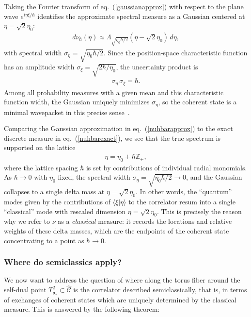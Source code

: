 \documentclass[a4paper,11pt]{article}
\theoremstyle{plain}
\theoremstyle{definition}
\theoremstyle{remark}
\newcommand{\bs}[1]{\boldsymbol{#1}}
\newcommand{\ba}{\begin{equation} \begin{aligned}}
\newcommand{\ea}{\end{aligned} \end{equation}}
\begin{document}
Taking the Fourier transform of eq.~(\ref{gaussianapprox}) with respect to the plane wave $e^{i\eta\xi/\hbar}$ identifies the approximate spectral measure as a Gaussian centered at $\eta = \sqrt{2}\eta_0$:
\ba
d\nu_\hbar(\eta) \approx \Lambda_{\sqrt{\eta_0 \hbar/2}}(\eta - \sqrt{2}\eta_0) \, d\eta,
\label{nuhbarapprox}
\ea
with spectral width $\sigma_\eta = \sqrt{\eta_0 \hbar/2}$. Since the position-space characteristic function has an amplitude width $\sigma_\xi = \sqrt{2\hbar/\eta_0}$, the uncertainty product is
\ba
\sigma_\eta \, \sigma_\xi = \hbar.
\ea
Among all probability measures with a given mean and this characteristic function width, the Gaussian uniquely minimizes $\sigma_\eta$, so the coherent state is a minimal wavepacket in this precise sense~\cite{FollandSitaram1997}.

Comparing the Gaussian approximation in eq.~(\ref{nuhbarapprox}) to the exact discrete measure in eq.~(\ref{nuhbarexact}), we see that the true spectrum is supported on the lattice
\ba
\eta = \eta_0 + \hbar \mathbb{Z}_+,
\ea
where the lattice spacing $\hbar$ is set by contributions of individual radial monomials. As $\hbar \to 0$ with $\eta_0$ fixed, the spectral width $\sigma_\eta = \sqrt{\eta_0\hbar/2} \to 0$, and the Gaussian collapses to a single delta mass at $\eta = \sqrt{2}\eta_0$. In other words, the ``quantum'' modes given by the contributions of $\langle \xi | \eta \rangle$ to the correlator resum into a single ``classical'' mode with rescaled dimension $\eta = \sqrt{2}\eta_0$. This is precisely the reason why we refer to $\nu$ as a \textit{classical} measure: it records the locations and relative weights of these delta masses, which are the endpoints of the coherent state concentrating to a point as $\hbar \to 0$.

\subsubsection{Where do semiclassics apply?}
We now want to address the question of where along the torus fiber around the self-dual point $T^2_{\bs{\rho}_*} \subset \widehat{\mathscr{C}}$ is the correlator described semiclassically, that is, in terms of exchanges of coherent states which are uniquely determined by the classical measure. This is answered by the following theorem:
\end{document}
